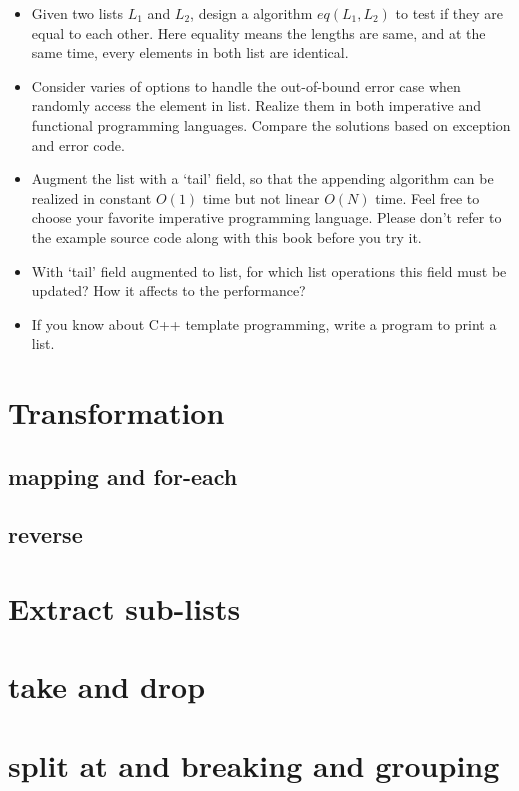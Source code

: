 \documentclass{article}
\begin{document}
\begin{Exercise}
\begin{itemize}
\item Given two lists $L_1$ and $L_2$, design a algorithm $eq(L_1, L_2)$ to test if they are equal to each other.
Here equality means the lengths are same, and at the same time, every elements in both list are identical.
\item Consider varies of options to handle the out-of-bound error case when randomly access the element in list. Realize
them in both imperative and functional programming languages. Compare the solutions based on exception and error code.
\item Augment the list with a `tail' field, so that the appending algorithm can be realized in constant $O(1)$ time but
not linear $O(N)$ time. Feel free to choose your favorite imperative programming language. Please don't refer to the
example source code along with this book before you try it.
\item With `tail' field augmented to list, for which list operations this field must be updated? How it affects to the
performance?
\item If you know about C++ template programming, write a program to print a list.
\end{itemize}
\end{Exercise}

\section{Transformation}

\subsection{mapping and for-each}

\subsection{reverse}

\section{Extract sub-lists}

\section{take and drop}

\section{split at and breaking and grouping}
\end{document}
